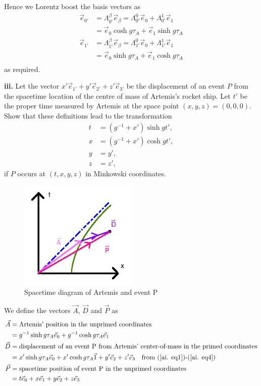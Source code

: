 \documentclass[a4paper]{article} %
\begin{document}
Hence we Lorentz boost the basis vectors as
\begin{align}
\vec{e}_{0'}&=\Lambda^{\beta}_{0'}\vec{e}_{\beta}=\Lambda^{0}_{0'}\vec{e}_{0}+\Lambda^{1}_{0'}\vec{e}_{1}\\
&=\vec{e}_0 \cosh g\tau_A +\vec{e}_1 \sinh g\tau_A\\
\vec{e}_{1'}&=\Lambda^{\beta}_{1'}\vec{e}_{\beta}=\Lambda^{0}_{1'}\vec{e}_{0}+\Lambda^{1}_{1'}\vec{e}_{1}\\
&=\vec{e}_0 \sinh g\tau_A +\vec{e}_1 \cosh g\tau_A\\
\end{align}
as required.

\begin{framed}
\textbf{iii.} 
Let the vector $x'\vec{e}_{1'}+y'\vec{e}_{2'}+z'\vec{e}_{3'}$ be the displacement of an event $P$ from the spacetime location of the centre of mass of Artemis’s rocket ship. Let $t'$ be the proper time measured by Artemis at the space point $(x,y,z)=(0,0,0)$. Show that these definitions lead to the transformation
\begin{align}
t&=(g^{-1}+x')\sinh gt', \label{aiii eq1} \\
x&=(g^{-1}+x') \cosh gt',\\
y&=y', \\
z&=z', \label{aiii eq4}
\end{align}
if $P$ occurs at $(t,x,y,z)$ in Minkowski coordinates.
\end{framed}

\begin{figure}[h]
\centering
\includegraphics[width=0.5\textwidth]{images/aiii_diagram.png}
\caption{Spacetime diagram of Artemis and event P}
\label{aiii diagram}
\end{figure}

We define the vectors $\vec{A}$, $\vec{D}$ and $\vec{P}$ as
\begin{align}
\vec{A}&=\text{Artemis' position in the unprimed coordinates}\\
&=g^{-1}\sinh g\tau_A \vec{e}_0+g^{-1}\cosh g\tau_A \vec{e}_1\\
\vec{D}&=\text{displacement of an event P from Artemis' center-of-mass in the primed coordinates}\\
&=x'\sinh g\tau_A \vec{e}_0+x'\cosh g\tau_A \vec{1}+y'\vec{e}_{2}+z'\vec{e}_{3} \quad\text{from (\ref{ai. eq1})-(\ref{ai. eq4})}\\
\vec{P}&=\text{spacetime position of event P in the unprimed coordinates}\\
&=t\vec{e}_0+x\vec{e}_1+y\vec{e}_2+z\vec{e}_3
\end{align}
\end{document}

